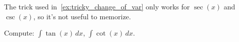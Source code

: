 \begin{Remark}{}{}
    The trick used in~\ref{ex:tricky_change_of_var} only works for $ \sec(x) $ and
    $ \csc(x) $, so it's not useful to memorize.
\end{Remark}

\begin{Exercise}{}{}
    Compute:
    $ \displaystyle\int \tan(x)\, d{x} $, $ \displaystyle\int \cot(x)\, d{x} $.
\end{Exercise}
